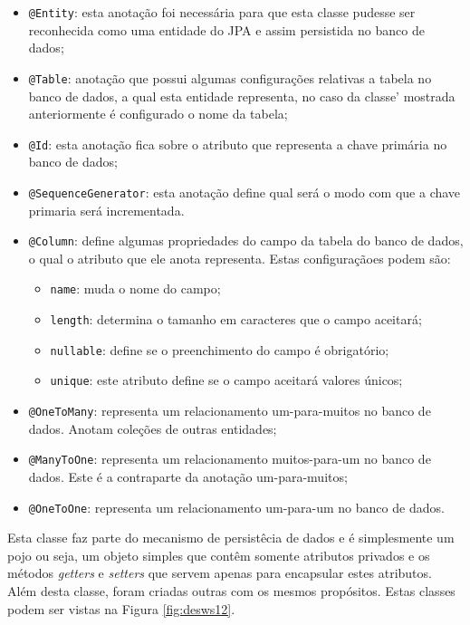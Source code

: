 	\begin{itemize}
	  \item \texttt{@Entity}: esta anotação foi necessária para que esta classe
	  pudesse ser reconhecida como uma entidade do JPA e assim persistida no banco
	  de dados;
	  \item \texttt{@Table}: anotação que possui algumas configurações relativas a
	  tabela no banco de dados, a qual esta entidade representa, no caso da classe'
	  mostrada anteriormente é configurado o nome da tabela;
	  \item \texttt{@Id}: esta anotação fica sobre o atributo que representa a
	  chave primária no banco de dados;
	  \item \texttt{@SequenceGenerator}: esta anotação define qual será o modo com
	  que a chave primaria será incrementada.
	  \item \texttt{@Column}: define algumas propriedades do campo da tabela do
	  banco de dados, o qual o atributo que ele anota representa. Estas
	  configuraçãoes podem são:
		  	\begin{itemize}
		    	\item \texttt{name}: muda o nome do campo;
		    	\item \texttt{length}: determina o tamanho em caracteres que o campo
		    	aceitará;
		    	\item \texttt{nullable}: define se o preenchimento do campo é obrigatório;
		    	\item \texttt{unique}: este atributo define se o campo aceitará valores
		    	únicos;
		    \end{itemize}
	  \item \texttt{@OneToMany}: representa um relacionamento um-para-muitos no
	  banco de dados. Anotam coleções de outras entidades;
	  \item \texttt{@ManyToOne}: representa um relacionamento
	  muitos-para-um no banco de dados. Este é a contraparte da anotação
	  um-para-muitos;
	  \item \texttt{@OneToOne}: representa um relacionamento um-para-um no banco de
	  dados.
\end{itemize}
 
	\par Esta classe faz parte do mecanismo de persistêcia de dados e é
simplesmente um  pojo ou seja, um objeto  simples que contêm somente atributos
privados e os métodos \textit{getters} e \textit{setters} que servem apenas
para encapsular estes atributos. Além desta classe, foram criadas outras com os
mesmos propósitos. Estas classes podem ser vistas na Figura \ref{fig:desws12}. 
	

